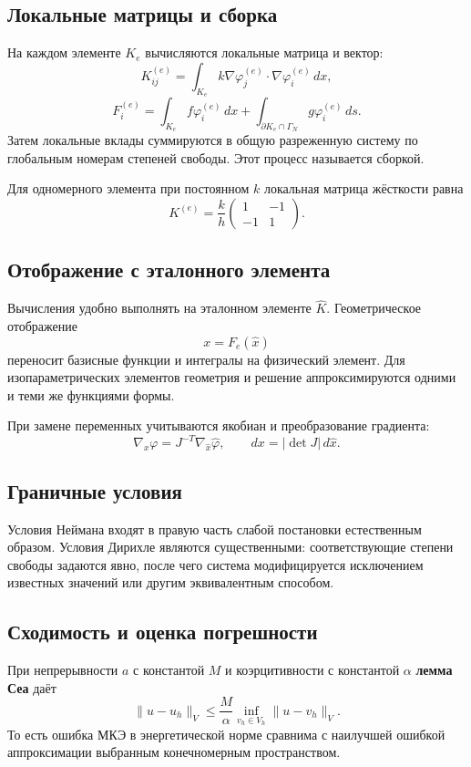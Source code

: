 \subsection{Локальные матрицы и сборка}

На каждом элементе $K_e$ вычисляются локальные матрица и вектор:
\[
    K_{ij}^{(e)}=
    \int_{K_e}k\nabla\varphi_j^{(e)}\cdot\nabla\varphi_i^{(e)}\,dx,
\]
\[
    F_i^{(e)}=
    \int_{K_e}f\varphi_i^{(e)}\,dx
    +\int_{\partial K_e\cap\Gamma_N}g\varphi_i^{(e)}\,ds.
\]
Затем локальные вклады суммируются в общую разреженную систему по глобальным
номерам степеней свободы. Этот процесс называется сборкой.

Для одномерного элемента при постоянном $k$ локальная матрица жёсткости равна
\[
    K^{(e)}=\frac{k}{h}
    \begin{pmatrix}
    1&-1\\
    -1&1
    \end{pmatrix}.
\]

\subsection{Отображение с эталонного элемента}

Вычисления удобно выполнять на эталонном элементе $\widehat K$. Геометрическое
отображение
\[
    x=F_e(\widehat x)
\]
переносит базисные функции и интегралы на физический элемент. Для
изопараметрических элементов геометрия и решение аппроксимируются одними и теми
же функциями формы.

При замене переменных учитываются якобиан и преобразование градиента:
\[
    \nabla_x\varphi=J^{-T}\nabla_{\widehat x}\widehat\varphi,
    \qquad
    dx=|\det J|\,d\widehat x.
\]

\subsection{Граничные условия}

Условия Неймана входят в правую часть слабой постановки естественным образом.
Условия Дирихле являются существенными: соответствующие степени свободы задаются
явно, после чего система модифицируется исключением известных значений или
другим эквивалентным способом.

\subsection{Сходимость и оценка погрешности}

При непрерывности $a$ с константой $M$ и коэрцитивности с константой $\alpha$
\textbf{лемма Сеа} даёт
\[
    \|u-u_h\|_V
    \leq \frac{M}{\alpha}
    \inf_{v_h\in V_h}\|u-v_h\|_V.
\]
То есть ошибка МКЭ в энергетической норме сравнима с наилучшей ошибкой
аппроксимации выбранным конечномерным пространством.

